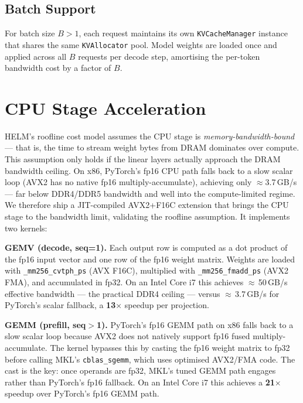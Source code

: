 \documentclass[lettersize,journal]{IEEEtran}
\begin{document}
\subsection{Batch Support}

For batch size $B > 1$, each request maintains its own \texttt{KVCacheManager}
instance that shares the same \texttt{KVAllocator} pool. Model weights are
loaded once and applied across all $B$ requests per decode step, amortising
the per-token bandwidth cost by a factor of $B$.

\section{CPU Stage Acceleration}
\label{sec:avx}

HELM's roofline cost model assumes the CPU stage is \emph{memory-bandwidth-bound}
--- that is, the time to stream weight bytes from DRAM dominates over compute.
This assumption only holds if the linear layers actually approach the DRAM
bandwidth ceiling. On x86, PyTorch's fp16 CPU path falls back to a slow scalar
loop (AVX2 has no native fp16 multiply-accumulate), achieving only
$\approx$3.7\,GB/s --- far below DDR4/DDR5 bandwidth and well into the
compute-limited regime. We therefore ship a JIT-compiled AVX2+F16C extension
that brings the CPU stage to the bandwidth limit, validating the roofline
assumption. It implements two kernels:

\textbf{GEMV (decode, seq=1).} Each output row is computed as a dot product
of the fp16 input vector and one row of the fp16 weight matrix. Weights are
loaded with \texttt{\_mm256\_cvtph\_ps} (AVX F16C), multiplied with
\texttt{\_mm256\_fmadd\_ps} (AVX2 FMA), and accumulated in fp32. On an
Intel Core i7 this achieves $\approx$\,50\,GB/s effective bandwidth --- the
practical DDR4 ceiling --- versus $\approx$\,3.7\,GB/s for PyTorch's scalar
fallback, a \textbf{13$\times$} speedup per projection.

\textbf{GEMM (prefill, seq$>$1).} PyTorch's fp16 GEMM path on x86 falls back
to a slow scalar loop because AVX2 does not natively support fp16 fused
multiply-accumulate. The kernel bypasses this by casting the fp16 weight
matrix to fp32 before calling MKL's \texttt{cblas\_sgemm}, which uses
optimised AVX2/FMA code. The cast is the key: once operands are fp32, MKL's
tuned GEMM path engages rather than PyTorch's fp16 fallback. On an Intel
Core i7 this achieves a \textbf{21$\times$} speedup over PyTorch's fp16
GEMM path.
\end{document}
